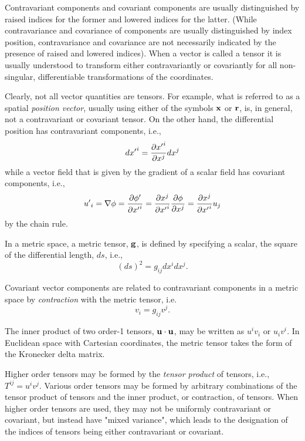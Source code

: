 \documentclass{llncs}
\begin{document}
Contravariant components and covariant components are usually
distinguished by raised indices for the former and lowered indices for
the latter.
(While contravariance and covariance of components are usually
distinguished by index position, contravariance and covariance are not
necessarily indicated by the presence of raised and lowered indices).
When a vector is called a tensor it is usually understood to transform
either contravariantly or covariantly for all non-singular,
differentiable transformations of the coordinates.

Clearly, not all vector quantities are tensors.
For example, what is referred to as a spatial {\em position vector},
usually using either of the symbols ${\bf x}$ or ${\bf r}$, is, in
general, not a contravariant or covariant tensor.
On the other hand, the differential position has contravariant
components, i.e.,
\begin{equation}
{dx'}^i = {\partial {x'}^i \over \partial x^{j}} dx^{j}
\end{equation}
while a vector field that is given by the gradient of a scalar field has
covariant components, i.e.,
\begin{equation}
{u'}_i = \nabla \phi
= {\partial {\phi '} \over \partial {x'}^i}
= {\partial x^j \over \partial {x'}^i} {\partial \phi \over \partial x^j}
= {\partial x^j \over \partial {x'}^i} u_j
\end{equation}
by the chain rule.

In a metric space, a metric tensor, ${\bf g}$, is defined by specifying a scalar,
the square of the differential length, $ds$, i.e.,
\begin{equation}
\left( ds \right) ^2 = g_{ij}dx^idx^j .
\end{equation}

Covariant vector components are related to contravariant components in
a metric space by {\em contraction} with the metric tensor, i.e.
\begin{equation}
v_i = g_{ij}v^j .
\end{equation}

The inner product of two order-1 tensors, ${\bf u} \cdot {\bf u}$, may
be written as $u^i v_i$ or $u_i v^i$.
In Euclidean space with Cartesian coordinates, the metric tensor takes
the form of the Kronecker delta matrix.

Higher order tensors may be formed by the {\em tensor product} of
tensors, i.e., $T^{ij} = u^iv^j$.
Various order tensors may be formed by arbitrary combinations of the
tensor product of tensors and the inner product, or contraction, of
tensors.
When higher order tensors are used, they may not be uniformly
contravariant or covariant, but instead have "mixed variance", which
leads to the designation of the indices of tensors being either
contravariant or covariant.
\end{document}
